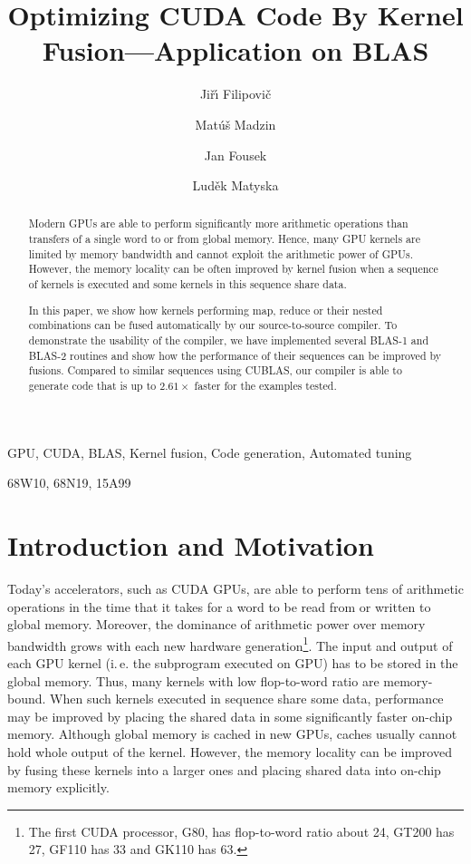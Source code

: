 \documentclass[final]{siamltex}
\title{Optimizing CUDA Code By Kernel Fusion---Application on BLAS}
\author{Ji\v{r}\'{\i} Filipovi\v{c}\footnotemark[2]
\and Mat\'{u}\v{s} Madzin\footnotemark[3]
\and Jan Fousek\footnotemark[3]
\and Lud\v{e}k Matyska\footnotemark[2]}
\def\ie{i.\,e.}
\begin{document}
\maketitle


\begin{abstract}

Modern GPUs are able to perform significantly more arithmetic operations than transfers of a single word to or from global memory. Hence, many GPU kernels are limited by memory bandwidth and cannot exploit the arithmetic power of GPUs. However, the memory locality can be often improved by kernel fusion when a sequence of kernels is executed and some kernels in this sequence share data.

In this paper, we show how kernels performing map, reduce or their nested combinations can be fused automatically by our source-to-source compiler. To demonstrate the usability of the compiler, we have implemented several BLAS-1 and BLAS-2 routines and show how the performance of their sequences can be improved by fusions. Compared to similar sequences using CUBLAS, our compiler is able to generate code that is up to $2.61\times$ faster for the examples tested. 

\end{abstract}

\begin{keywords}
GPU, CUDA, BLAS, Kernel fusion, Code generation, Automated tuning
\end{keywords}

\begin{AMS}
68W10, 68N19, 15A99
\end{AMS}

\section{Introduction and Motivation}

Today's accelerators, such as CUDA GPUs, are able to perform tens of arithmetic operations in the time that it takes for a word to be read from or written to global memory. Moreover, the dominance of arithmetic power over memory bandwidth grows with each new hardware generation\footnote{The first CUDA processor, G80, has flop-to-word ratio about 24, GT200 has 27, GF110 has 33 and GK110 has 63.}. The input and output of each GPU kernel (\ie{} the subprogram executed on GPU) has to be stored in the global memory. Thus, many kernels  with low flop-to-word ratio are memory-bound. When such kernels executed in sequence share some data, performance may be improved by placing the shared data in some significantly faster on-chip memory. Although global memory is cached in new GPUs, caches usually cannot hold whole output of the kernel. However, the memory locality can be improved by fusing these kernels into a larger ones and placing shared data into on-chip memory explicitly.
\end{document}
